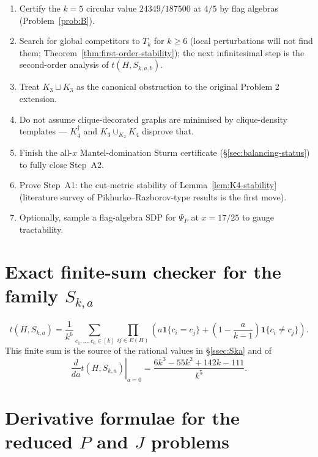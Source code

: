 \documentclass[11pt]{amsart}
\theoremstyle{definition}
\newcommand{\1}{\mathbf 1}
\begin{document}
\begin{enumerate}[label=\textbf{Task \arabic*.},itemsep=3pt]
\item Certify the $k=5$ circular value $24349/187500$ at $4/5$ by flag algebras
(Problem~\ref{prob:B}).
\item Search for global competitors to $T_k$ for $k\ge6$ (local perturbations
will not find them; Theorem~\ref{thm:first-order-stability}); the next
infinitesimal step is the second-order analysis of $t(H,S_{k,a,b})$.
\item Treat $K_3\sqcup K_3$ as the canonical obstruction to the original
Problem 2 extension.
\item Do not assume clique-decorated graphs are minimised by clique-density
templates --- $K_4^\dagger$ and $K_3\cup_{K_2}K_4$ disprove that.
\item Finish the all-$x$ Mantel-domination Sturm certificate
(\S\ref{sec:balancing-status}) to fully close Step~A2.
\item Prove Step~A1: the cut-metric stability of Lemma~\ref{lem:K4-stability}
(literature survey of Pikhurko--Razborov-type results is the first move).
\item Optionally, sample a flag-algebra SDP for $\Psi_P$ at $x=17/25$ to gauge
tractability.
\end{enumerate}

\appendix

\section{Exact finite-sum checker for the family $S_{k,a}$}
\label{app:Ska}

\[
   t(H,S_{k,a})=\frac1{k^6}\sum_{c_1,\ldots,c_6\in[k]}
        \prod_{ij\in E(H)}
        \left(a\1\{c_i=c_j\}+\left(1-\frac{a}{k-1}\right)\1\{c_i\ne c_j\}\right).
\]
This finite sum is the source of the rational values in \S\ref{ssec:Ska} and of
\[
   \left.\frac{d}{da}t(H,S_{k,a})\right|_{a=0}
   =\frac{6k^3-55k^2+142k-111}{k^5}.
\]

\section{Derivative formulae for the reduced $P$ and $J$ problems}
\label{app:derivatives}
\end{document}
